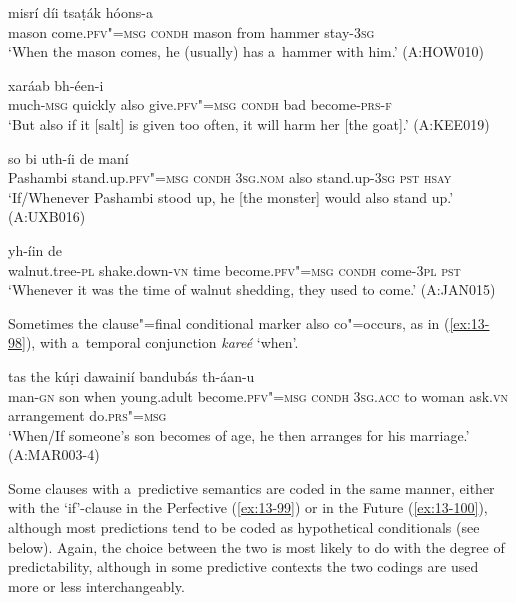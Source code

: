 \begin{exe}
\ex
\label{ex:13-94}
 misrí díi tsaṭák hóons-a \\
mason come.\textsc{pfv"=msg} \textsc{condh} mason from hammer stay-\textsc{3sg}  \\
\glt `When the mason comes, he (usually) has a~hammer with him.' (A:HOW010)

\ex
\label{ex:13-95}
 xaráab  bh-éen-i \\
much-\textsc{msg} quickly also give.\textsc{pfv"=msg} \textsc{condh} bad  become-\textsc{prs-f}   \\
\glt `But also if it [salt] is given too often, it will harm her [the goat].' (A:KEE019)

\ex
\label{ex:13-96}
 so bi  uth-íi de maní \\
Pashambi stand.up.\textsc{pfv"=msg} \textsc{condh} \textsc{3sg.nom} also stand.up-\textsc{3sg} \textsc{pst} \textsc{hsay}  \\
\glt `If/Whenever Pashambi stood up, he [the monster] would also stand up.' (A:UXB016)

\ex
\label{ex:13-97}
\gll [ac̣húuṛi-m ṭhak"=ainií waxt bhíl-u sée$\sim$ta]  yh-íin de \\
walnut.tree-\textsc{pl} shake.down-\textsc{vn} time become.\textsc{pfv"=msg} \textsc{condh} come-\textsc{3pl} \textsc{ pst}    \\
\glt `Whenever it was the time of walnut shedding, they used to come.' (A:JAN015) 
\end{exe}

Sometimes the clause"=final conditional marker also co"=occurs, as in (\ref{ex:13-98}), with a~temporal conjunction \textit{kareé} `when'. 

\begin{exe}
\ex
\label{ex:13-98}
  tas the kúṛi dawainií
bandubás  th-áan-u \\
man-\textsc{gn} son when young.adult become.\textsc{pfv"=msg} \textsc{condh} \textsc{3sg.acc} to woman ask.\textsc{vn} arrangement do.\textsc{prs"=msg}  \\
\glt `When/If someone's son becomes of age, he then arranges for his marriage.' (A:MAR003-4) 
\end{exe}

Some clauses with a~predictive semantics are coded in the same manner, either with the `if'-clause in the Perfective (\ref{ex:13-99}) or in the Future (\ref{ex:13-100}), although most predictions tend to be coded as hypothetical conditionals (see below). Again, the choice between the two is most likely to do with the degree of predictability, although in some predictive contexts the two codings are used more or less interchangeably.

